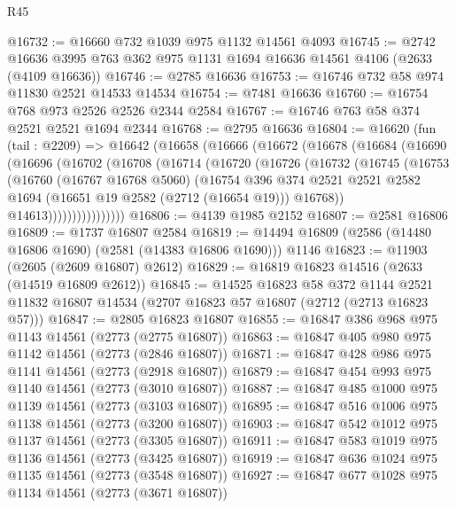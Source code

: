 \begin{lexlean}{R45}
\begin{coremodule}
@16732 := @16660 @732 @1039 @975 @1132 @14561 @4093
@16745 := @2742 @16636 @3995 @763 @362 @975 @1131 @1694 @16636 @14561 @4106 (@2633 (@4109 @16636))
@16746 := @2785 @16636
@16753 := @16746 @732 @58 @974 @11830 @2521 @14533 @14534
@16754 := @7481 @16636
@16760 := @16754 @768 @973 @2526 @2526 @2344 @2584
@16767 := @16746 @763 @58 @374 @2521 @2521 @1694 @2344
@16768 := @2795 @16636
@16804 := @16620
    (fun (tail : @2209) =>
    @16642
      (@16658
        (@16666
          (@16672
            (@16678
              (@16684
                (@16690
                  (@16696
                    (@16702
                      (@16708
                        (@16714
                          (@16720
                            (@16726
                              (@16732
                                (@16745
                                  (@16753
                                    (@16760
                                      (@16767 @16768 @5060)
                                      (@16754
                                        @396
                                        @374
                                        @2521
                                        @2521
                                        @2582
                                        @1694
                                        (@16651 @19 @2582 (@2712 (@16654 @19)))
                                        @16768))
                                    @14613))))))))))))))))
@16806 := @4139 @1985 @2152
@16807 := @2581 @16806
@16809 := @1737 @16807 @2584
@16819 := @14494 @16809 (@2586 (@14480 @16806 @1690) (@2581 (@14383 @16806 @1690))) @1146
@16823 := @11903 (@2605 (@2609 @16807) @2612)
@16829 := @16819 @16823 @14516 (@2633 (@14519 @16809 @2612))
@16845 := @14525
    @16823
    @58
    @372
    @1144
    @2521
    @11832
    @16807
    @14534
    (@2707 @16823 @57 @16807 (@2712 (@2713 @16823 @57)))
@16847 := @2805 @16823 @16807
@16855 := @16847 @386 @968 @975 @1143 @14561 (@2773 (@2775 @16807))
@16863 := @16847 @405 @980 @975 @1142 @14561 (@2773 (@2846 @16807))
@16871 := @16847 @428 @986 @975 @1141 @14561 (@2773 (@2918 @16807))
@16879 := @16847 @454 @993 @975 @1140 @14561 (@2773 (@3010 @16807))
@16887 := @16847 @485 @1000 @975 @1139 @14561 (@2773 (@3103 @16807))
@16895 := @16847 @516 @1006 @975 @1138 @14561 (@2773 (@3200 @16807))
@16903 := @16847 @542 @1012 @975 @1137 @14561 (@2773 (@3305 @16807))
@16911 := @16847 @583 @1019 @975 @1136 @14561 (@2773 (@3425 @16807))
@16919 := @16847 @636 @1024 @975 @1135 @14561 (@2773 (@3548 @16807))
@16927 := @16847 @677 @1028 @975 @1134 @14561 (@2773 (@3671 @16807))

\end{coremodule}
\end{lexlean}
